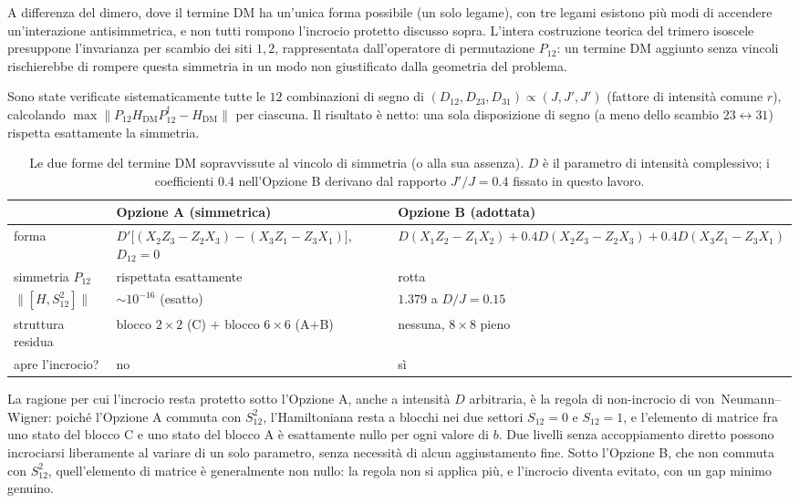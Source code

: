 \documentclass[11pt,a4paper]{article}
\begin{document}
A differenza del dimero, dove il termine DM ha un'unica forma possibile
(un solo legame), con tre legami esistono più modi di accendere
un'interazione antisimmetrica, e non tutti rompono l'incrocio protetto
discusso sopra. L'intera costruzione teorica del trimero isoscele
presuppone l'invarianza per scambio dei siti $1,2$, rappresentata
dall'operatore di permutazione $P_{12}$: un termine DM aggiunto senza
vincoli rischierebbe di rompere questa simmetria in un modo non
giustificato dalla geometria del problema.

Sono state verificate sistematicamente tutte le $12$ combinazioni di
segno di $(D_{12},D_{23},D_{31})\propto(J,J',J')$ (fattore di intensità
comune $r$), calcolando $\max\lVert P_{12}H_\text{DM}P_{12}^\dagger -
H_\text{DM}\rVert$ per ciascuna. Il risultato è netto: una sola
disposizione di segno (a meno dello scambio $23\leftrightarrow31$)
rispetta esattamente la simmetria.

\begin{table}[htbp]
\centering
\renewcommand{\arraystretch}{1.4}
\begin{tabular}{@{}p{2.3cm}p{6.3cm}p{6.3cm}@{}}
\toprule
\rowcolor{grigetto}
& \textbf{Opzione A} (simmetrica) & \textbf{Opzione B} (adottata) \\
\midrule
forma & $D'\big[(X_2Z_3{-}Z_2X_3)-(X_3Z_1{-}Z_3X_1)\big]$, $D_{12}=0$ &
$D(X_1Z_2{-}Z_1X_2)+0.4D(X_2Z_3{-}Z_2X_3)+0.4D(X_3Z_1{-}Z_3X_1)$ \\
simmetria $P_{12}$ & rispettata esattamente & rotta \\
$\lVert[H,S_{12}^2]\rVert$ & $\sim10^{-16}$ (esatto) & $1.379$ a
$D/J{=}0.15$ \\
struttura residua & blocco $2{\times}2$ (C) $+$ blocco $6{\times}6$
(A$+$B) & nessuna, $8\times8$ pieno \\
apre l'incrocio? & no & sì \\
\bottomrule
\end{tabular}
\caption{Le due forme del termine DM sopravvissute al vincolo di
simmetria (o alla sua assenza). $D$ è il parametro di intensità
complessivo; i coefficienti $0.4$ nell'Opzione B derivano dal rapporto
$J'/J=0.4$ fissato in questo lavoro.}
\label{tab:dm-opzioni}
\end{table}
\FloatBarrier

La ragione per cui l'incrocio resta protetto sotto l'Opzione A, anche a
intensità $D$ arbitraria, è la regola di non-incrocio di
von~Neumann--Wigner: poiché l'Opzione A commuta con $S_{12}^2$,
l'Hamiltoniana resta a blocchi nei due settori $S_{12}=0$ e $S_{12}=1$, e
l'elemento di matrice fra uno stato del blocco C e uno stato del blocco A
è esattamente nullo per ogni valore di $b$. Due livelli senza
accoppiamento diretto possono incrociarsi liberamente al variare di un
solo parametro, senza necessità di alcun aggiustamento fine. Sotto
l'Opzione B, che non commuta con $S_{12}^2$, quell'elemento di matrice è
generalmente non nullo: la regola non si applica più, e l'incrocio
diventa evitato, con un gap minimo genuino.
\end{document}
